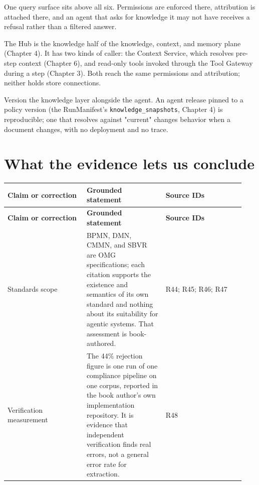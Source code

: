 One query surface sits above all six. Permissions are enforced there, attribution is attached there, and an agent that asks for knowledge it may not have receives a refusal rather than a filtered answer.\par

The Hub is the knowledge half of the knowledge, context, and memory plane (Chapter 4). It has two kinds of caller: the Context Service, which resolves pre-step context (Chapter 6), and read-only tools invoked through the Tool Gateway during a step (Chapter 3). Both reach the same permissions and attribution; neither holds store connections.\par

\begin{bookproduction}
Version the knowledge layer alongside the agent. An agent release pinned to a policy version (the RunManifest's \lstinline[style=bookinline]!knowledge_snapshots!, Chapter 4) is reproducible; one that resolves against "current" changes behavior when a document changes, with no deployment and no trace.
\end{bookproduction}

\section{What the evidence lets us conclude}

\BookTableStart
\small
\begin{longtable}{@{}Y{0.3133\linewidth}Y{0.3133\linewidth}Y{0.3133\linewidth}@{}}
\color{white}\bfseries \textbf{Claim or correction} & \color{white}\bfseries \textbf{Grounded statement} & \color{white}\bfseries \textbf{Source IDs} \\
\endfirsthead
{}
\color{white}\bfseries \textbf{Claim or correction} & \color{white}\bfseries \textbf{Grounded statement} & \color{white}\bfseries \textbf{Source IDs} \\
\endhead
Standards scope & BPMN, DMN, CMMN, and SBVR are OMG specifications; each citation supports the existence and semantics of its own standard and nothing about its suitability for agentic systems. That assessment is book-authored. & R44; R45; R46; R47 \\
Verification measurement & The 44\% rejection figure is one run of one compliance pipeline on one corpus, reported in the book author's own implementation repository. It is evidence that independent verification finds real errors, not a general error rate for extraction. & R48 \\
\end{longtable}
\BookTableEnd

